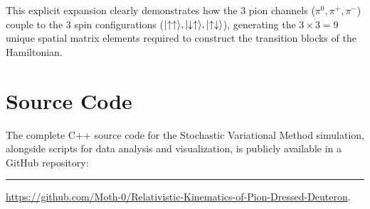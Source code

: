\documentclass[a4paper,oneside,article,12pt]{memoir}
\begin{document}
This explicit expansion clearly demonstrates how the 3 pion channels ($\pi^0, \pi^+, \pi^-$) couple to the 3 spin configurations ($\lvert\uparrow\uparrow\rangle, \lvert\downarrow\uparrow\rangle, \lvert\uparrow\downarrow\rangle$), generating the $3 \times 3 = 9$ unique spatial matrix elements required to construct the transition blocks of the Hamiltonian.

\vspace{20pt}
\chapter{Source Code} \label{ap:code}
The complete C++ source code for the Stochastic Variational Method simulation, alongside scripts for data analysis and visualization, is publicly available in a GitHub repository: 
\plainbreak{1}
\url{https://github.com/Moth-0/Relativistic-Kinematics-of-Pion-Dressed-Deuteron}.
\end{document}

